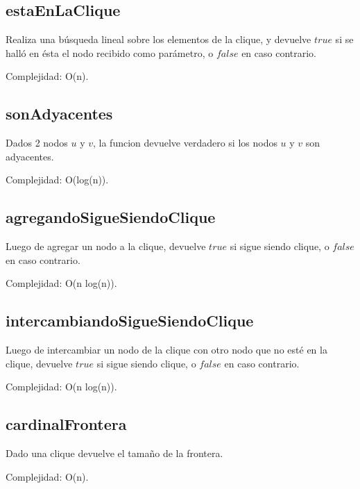 \subsection{estaEnLaClique}
Realiza una búsqueda lineal sobre los elementos de la clique, y devuelve $true$ si se halló en ésta el nodo recibido como parámetro, o $false$ en caso contrario.

Complejidad: O(n).

\subsection{sonAdyacentes}
Dados 2 nodos $u$ y $v$, la funcion devuelve verdadero si los nodos $u$ y $v$ son adyacentes.

Complejidad: O(log(n)).

\subsection{agregandoSigueSiendoClique}
Luego de agregar un nodo a la clique, devuelve $true$ si sigue siendo clique, o $false$ en caso contrario.

Complejidad: O(n log(n)).

\subsection{intercambiandoSigueSiendoClique}
Luego de intercambiar un nodo de la clique con otro nodo que no esté en la clique, devuelve $true$ si sigue siendo clique, o $false$ en caso contrario.

Complejidad: O(n log(n)).

\subsection{cardinalFrontera}
Dado una clique devuelve el tamaño de la frontera.

Complejidad: O(n).
